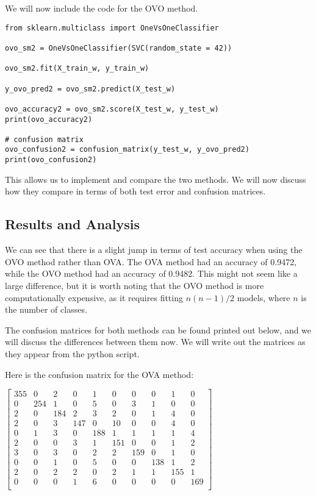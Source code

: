 \documentclass[12pt, letterpaper]{article}
\begin{document}
We will now include the code for the OVO method. 

\begin{verbatim}
from sklearn.multiclass import OneVsOneClassifier 

ovo_sm2 = OneVsOneClassifier(SVC(random_state = 42))

ovo_sm2.fit(X_train_w, y_train_w)

y_ovo_pred2 = ovo_sm2.predict(X_test_w) 

ovo_accuracy2 = ovo_sm2.score(X_test_w, y_test_w) 
print(ovo_accuracy2) 

# confusion matrix 
ovo_confusion2 = confusion_matrix(y_test_w, y_ovo_pred2) 
print(ovo_confusion2) 
\end{verbatim} 

This allows us to implement and compare the two methods. We will now discuss how they compare in terms of both test error and confusion matrices. 

\subsection{Results and Analysis} 

We can see that there is a slight jump in terms of test accuracy when using the OVO method rather than OVA. The OVA method had an accuracy of 0.9472, while the OVO method had an accuracy of 0.9482. 
This might not seem like a large difference, but it is worth noting that the OVO method is more computationally expensive, as it requires fitting $n(n-1)/2$ models, where $n$ is the number of classes. 

The confusion matrices for both methods can be found printed out below, and we will discuss the differences between them now. We will write out the matrices as they appear from the python script. 
\bigskip

Here is the confusion matrix for the OVA method:

\bigskip
$\begin{bmatrix}
  355 & 0 & 2 & 0 & 1 & 0 & 0 & 0 & 1 & 0 \\
  0 & 254 & 1 & 0 & 5 & 0 & 3 & 1 & 0 & 0 \\
  2 & 0 & 184 & 2 & 3 & 2 & 0 & 1 & 4 & 0 \\
  2 & 0 & 3 & 147 & 0 & 10 & 0 & 0 & 4 & 0 \\
  0 & 1 & 3 & 0 & 188 & 1 & 1 & 1 & 1 & 4 \\
  2 & 0 & 0 & 3 & 1 & 151 & 0 & 0 & 1 & 2 \\
  3 & 0 & 3 & 0 & 2 & 2 & 159 & 0 & 1 & 0 \\
  0 & 0 & 1 & 0 & 5 & 0 & 0 & 138 & 1 & 2 \\
  2 & 0 & 2 & 2 & 0 & 2 & 1 & 1 & 155 & 1 \\
  0 & 0 & 0 & 1 & 6 & 0 & 0 & 0 & 0 & 169 \\
\end{bmatrix}$
\bigskip
\end{document}
